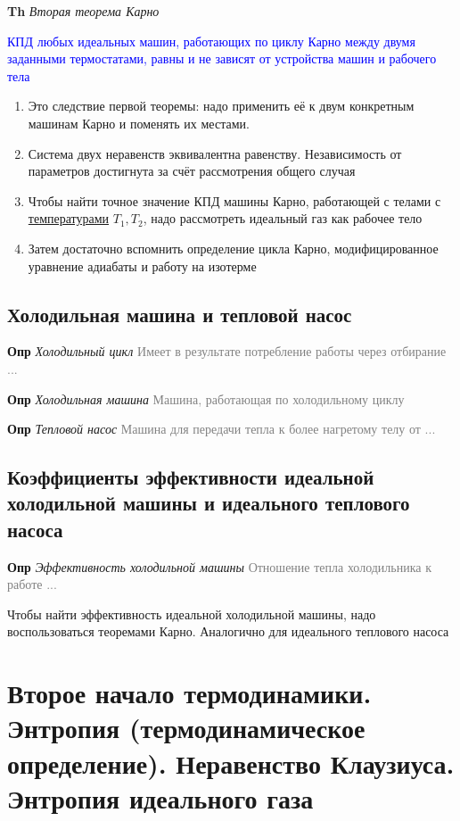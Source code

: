 \documentclass[a4paper, 14pt]{article}
\begin{document}
    \textbf{Th} \textit{Вторая теорема Карно}

    \textcolor{blue}{КПД любых идеальных машин, работающих по циклу Карно между двумя заданными термостатами, равны и
    не зависят от устройства машин и рабочего тела}

    \begin{enumerate}
        \item Это следствие первой теоремы: надо применить её к двум конкретным машинам Карно и поменять их местами.
        \item Система двух неравенств эквивалентна равенству.
        Независимость от параметров достигнута за счёт рассмотрения общего случая
        \item Чтобы найти точное значение КПД машины Карно, работающей с телами с \underline{температурами} $T_1, T_2$,
        надо рассмотреть идеальный газ как рабочее тело
        \item Затем достаточно вспомнить определение цикла Карно, модифицированное уравнение адиабаты и работу на
        изотерме
    \end{enumerate}

    \subsection{Холодильная машина и тепловой насос}

    \textbf{Опр} \textit{Холодильный цикл} \textcolor{gray}{Имеет в результате потребление работы через отбирание ...}

    \textbf{Опр} \textit{Холодильная машина} \textcolor{gray}{Машина, работающая по холодильному циклу}

    \textbf{Опр} \textit{Тепловой насос} \textcolor{gray}{Машина для передачи тепла к более нагретому телу от ...}

    \subsection{Коэффициенты эффективности идеальной холодильной машины и идеального теплового насоса}

    \textbf{Опр} \textit{Эффективность холодильной машины} \textcolor{gray}{Отношение тепла холодильника к работе ...}

    Чтобы найти эффективность идеальной холодильной машины, надо воспользоваться теоремами Карно.
    Аналогично для идеального теплового насоса

    \section{Второе начало термодинамики.
    Энтропия (термодинамическое определение).
    Неравенство Клаузиуса.
    Энтропия идеального газа}
\end{document}
